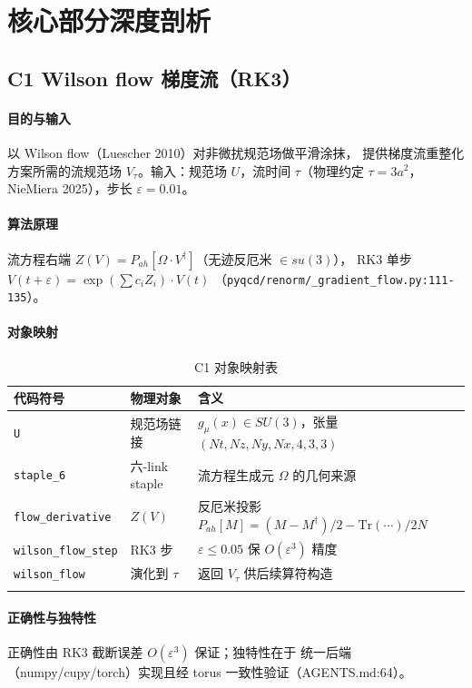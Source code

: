 \documentclass[UTF8]{ctexart}
\begin{document}
\section{核心部分深度剖析}

\subsection{C1 Wilson flow 梯度流（RK3）}
\paragraph{目的与输入} 以 Wilson flow（Luescher 2010）对非微扰规范场做平滑涂抹，
提供梯度流重整化方案所需的流规范场 $V_\tau$。输入：规范场 $U$，流时间 $\tau$（物理约定 $\tau=3a^2$，NieMiera 2025），步长 $\varepsilon=0.01$。
\paragraph{算法原理} 流方程右端 $Z(V)=P_{ah}[\Omega\cdot V^\dagger]$（无迹反厄米 $\in su(3)$），
RK3 单步 $V(t+\varepsilon)=\exp(\sum c_i Z_i)\cdot V(t)$
（\textcolor{evidence}{\texttt{\nolinkurl{pyqcd/renorm/_gradient_flow.py:111-135}}}）。
\paragraph{对象映射}
\begin{xltabular}{\textwidth}{llX}
\toprule
\textcolor{relation}{代码符号} & 物理对象 & 含义 \\
\midrule
\endhead
\texttt{U} & 规范场链接 & $g_\mu(x)\in SU(3)$，张量 $(Nt,Nz,Ny,Nx,4,3,3)$ \\
\texttt{staple\_6} & 六-link  staple & 流方程生成元 $\Omega$ 的几何来源 \\
\texttt{flow\_derivative} & $Z(V)$ & 反厄米投影 $P_{ah}[M]=(M-M^\dagger)/2-\mathrm{Tr}(\cdots)/2N$ \\
\texttt{wilson\_flow\_step} & RK3 步 & $\varepsilon\le0.05$ 保 $O(\varepsilon^3)$ 精度 \\
\texttt{wilson\_flow} & 演化到 $\tau$ & 返回 $V_\tau$ 供后续算符构造 \\
\bottomrule
\caption{C1 对象映射表}
\end{xltabular}
\paragraph{正确性与独特性} 正确性由 RK3 截断误差 $O(\varepsilon^3)$ 保证；独特性在于
统一后端（numpy/cupy/torch）实现且经 torus 一致性验证（AGENTS.md:64）。
\end{document}
